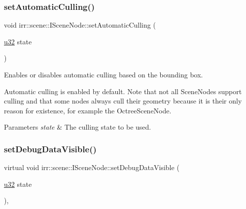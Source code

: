 \subsubsection{\texorpdfstring{set\+Automatic\+Culling()}{setAutomaticCulling()}\hspace{0.1cm}{\footnotesize\ttfamily [2/2]}}
{\footnotesize\ttfamily void irr\+::scene\+::\+I\+Scene\+Node\+::set\+Automatic\+Culling (\begin{DoxyParamCaption}\item[{\hyperlink{namespaceirr_a0416a53257075833e7002efd0a18e804}{u32}}]{state }\end{DoxyParamCaption})\hspace{0.3cm}{\ttfamily [inline]}}



Enables or disables automatic culling based on the bounding box. 

Automatic culling is enabled by default. Note that not all Scene\+Nodes support culling and that some nodes always cull their geometry because it is their only reason for existence, for example the Octree\+Scene\+Node. 
\begin{DoxyParams}{Parameters}
{\em state} & The culling state to be used. \\
\hline
\end{DoxyParams}
\mbox{\label{classirr_1_1scene_1_1ISceneNode_ad83877ca84fa9cde95f099f961e80577}} 
\subsubsection{\texorpdfstring{set\+Debug\+Data\+Visible()}{setDebugDataVisible()}\hspace{0.1cm}{\footnotesize\ttfamily [1/2]}}
{\footnotesize\ttfamily virtual void irr\+::scene\+::\+I\+Scene\+Node\+::set\+Debug\+Data\+Visible (\begin{DoxyParamCaption}\item[{\hyperlink{namespaceirr_a0416a53257075833e7002efd0a18e804}{u32}}]{state }\end{DoxyParamCaption})\hspace{0.3cm}{\ttfamily [inline]}, {\ttfamily [virtual]}}




